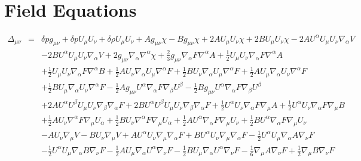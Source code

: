\documentclass[10pt,letterpaper]{article}
\numberwithin{equation}{section}
\begin{document}
\section{Field Equations}
%
\begin{eqnarray}
\Delta_{\mu\nu}&=& \delta p g_{\mu \nu } + \delta p U_{\mu } U_{\nu } + \delta \rho U_{\mu } U_{\nu } + A g_{\mu \nu } \chi -  B g_{\mu \nu } \chi + 2 A U_{\mu } U_{\nu } \chi + 2 B U_{\mu } U_{\nu } \chi - 2 A U^{\alpha } U_{\mu } U_{\nu } \nabla_{\alpha }V \nonumber \\ 
&& - 2 B U^{\alpha } U_{\mu } U_{\nu } \nabla_{\alpha }V + 2 g_{\mu \nu } \nabla_{\alpha }\nabla^{\alpha }\chi + \tfrac{2}{3} g_{\mu \nu } \nabla_{\alpha }F \nabla^{\alpha }A + \tfrac{1}{2} U_{\mu } U_{\nu } \nabla_{\alpha }F \nabla^{\alpha }A \nonumber \\ 
&& + \tfrac{1}{2} U_{\mu } U_{\nu } \nabla_{\alpha }F \nabla^{\alpha }B + \tfrac{1}{2} A U_{\nu } \nabla_{\alpha }U_{\mu } \nabla^{\alpha }F + \tfrac{1}{2} B U_{\nu } \nabla_{\alpha }U_{\mu } \nabla^{\alpha }F + \tfrac{1}{2} A U_{\mu } \nabla_{\alpha }U_{\nu } \nabla^{\alpha }F \nonumber \\ 
&& + \tfrac{1}{2} B U_{\mu } \nabla_{\alpha }U_{\nu } \nabla^{\alpha }F -  \tfrac{1}{2} A g_{\mu \nu } U^{\alpha } \nabla_{\alpha }F \nabla_{\beta }U^{\beta } -  \tfrac{1}{2} B g_{\mu \nu } U^{\alpha } \nabla_{\alpha }F \nabla_{\beta }U^{\beta } \nonumber \\ 
&& + 2 A U^{\alpha } U^{\beta } U_{\mu } U_{\nu } \nabla_{\beta }\nabla_{\alpha }F + 2 B U^{\alpha } U^{\beta } U_{\mu } U_{\nu } \nabla_{\beta }\nabla_{\alpha }F + \tfrac{1}{2} U^{\alpha } U_{\nu } \nabla_{\alpha }F \nabla_{\mu }A + \tfrac{1}{2} U^{\alpha } U_{\nu } \nabla_{\alpha }F \nabla_{\mu }B \nonumber \\ 
&& + \tfrac{1}{2} A U_{\nu } \nabla^{\alpha }F \nabla_{\mu }U_{\alpha } + \tfrac{1}{2} B U_{\nu } \nabla^{\alpha }F \nabla_{\mu }U_{\alpha } + \tfrac{1}{2} A U^{\alpha } \nabla_{\alpha }F \nabla_{\mu }U_{\nu } + \tfrac{1}{2} B U^{\alpha } \nabla_{\alpha }F \nabla_{\mu }U_{\nu } \nonumber \\ 
&& -  A U_{\nu } \nabla_{\mu }V -  B U_{\nu } \nabla_{\mu }V + A U^{\alpha } U_{\nu } \nabla_{\mu }\nabla_{\alpha }F + B U^{\alpha } U_{\nu } \nabla_{\mu }\nabla_{\alpha }F -  \tfrac{1}{2} U^{\alpha } U_{\mu } \nabla_{\alpha }A \nabla_{\nu }F \nonumber \\ 
&& -  \tfrac{1}{2} U^{\alpha } U_{\mu } \nabla_{\alpha }B \nabla_{\nu }F -  \tfrac{1}{2} A U_{\mu } \nabla_{\alpha }U^{\alpha } \nabla_{\nu }F -  \tfrac{1}{2} B U_{\mu } \nabla_{\alpha }U^{\alpha } \nabla_{\nu }F -  \tfrac{1}{6} \nabla_{\mu }A \nabla_{\nu }F + \tfrac{1}{2} \nabla_{\mu }B \nabla_{\nu }F \nonumber \\ 

\end{eqnarray}
\end{document}
